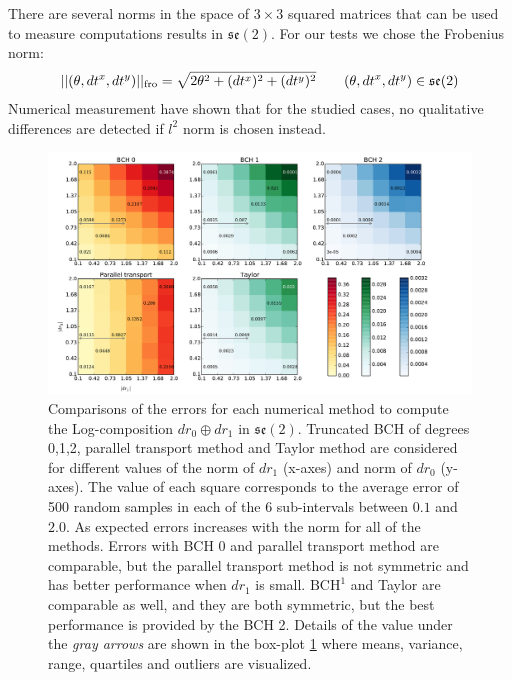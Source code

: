 There are several norms in the space of $3\times 3$ squared matrices that can be used to measure computations results in $\mathfrak{se}(2)$. For our tests we chose the Frobenius norm:
\begin{align*}
\vert\lvert (\theta,dt^{x},dt^{y}) \rvert\vert_{\text{fro}} = \sqrt{2\theta^{2} + (dt^{x})^2 + (dt^{y})^2} 
\qquad
(\theta,dt^{x},dt^{y}) \in \mathfrak{se}(2)
\end{align*}
Numerical measurement have shown that for the studied cases, no qualitative differences are detected if $l^{2}$ norm is chosen instead.
 \begin{figure}[!ht]
 	\hspace{-1.3cm}
 	\includegraphics[scale=0.50]{figures/se2_image_scale.pdf}
 	\caption{Comparisons of the errors for each numerical method to compute the Log-composition $dr_{0} \oplus dr_{1}$ in $\mathfrak{se}(2)$. Truncated BCH of degrees 0,1,2, parallel transport method and Taylor method are considered for different values of the norm of $dr_{1}$ (x-axes) and norm of $dr_{0}$ (y-axes). 
 	The value of each square corresponds to the average error of 500 random samples in each of the 6 sub-intervals between $0.1$ and $2.0$. 
 	As expected errors increases with the norm for all of the methods.
 	Errors with BCH 0 and parallel transport method are comparable, but the parallel transport method is not symmetric and has better performance when $dr_{1}$ is small. $\text{BCH}^1$ and Taylor are comparable as well, and they are both symmetric, but the best performance is provided by the BCH 2. Details of the value under the \emph{gray arrows} are shown in the box-plot \ref{fig:se2_image_scale} where means, variance, range, quartiles and outliers are visualized.
 	 }
 	\label{fig:se2_image_scale}
 \end{figure}
